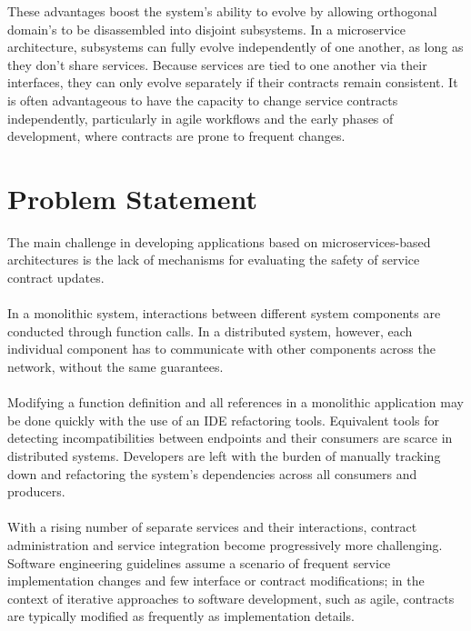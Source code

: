 These advantages boost the system's ability to evolve by allowing orthogonal domain's to be disassembled into disjoint subsystems.
In a microservice architecture, subsystems can fully evolve independently of one another, as long as they don't share services.
Because services are tied to one another via their interfaces, they can only evolve separately if their contracts remain consistent.
It is often advantageous to have the capacity to change service contracts independently,
particularly in agile workflows and the early phases of development, where contracts are prone to frequent changes.

\section{Problem Statement} %
\label{sec:problem_statement}

The main challenge in developing applications based on microservices-based architectures is the lack of mechanisms for evaluating the safety of service contract updates.

\paragraph{}

In a monolithic system, interactions between different system components are conducted through function calls.
In a distributed system, however, each individual component has to communicate with other components across the network,
without the same guarantees.

\paragraph{}

Modifying a function definition and all references in a monolithic application may be done quickly with the use of an IDE refactoring tools.
Equivalent tools for detecting incompatibilities between endpoints and their consumers are scarce in distributed systems.
Developers are left with the burden of manually tracking down and refactoring the system's dependencies across all consumers and producers.

\paragraph{}

With a rising number of separate services and their interactions, contract administration and service integration become progressively more challenging.
Software engineering guidelines assume a scenario of frequent service implementation changes and few interface or contract modifications;
in the context of iterative approaches to software development, such as agile, contracts are typically modified as frequently as implementation details.


